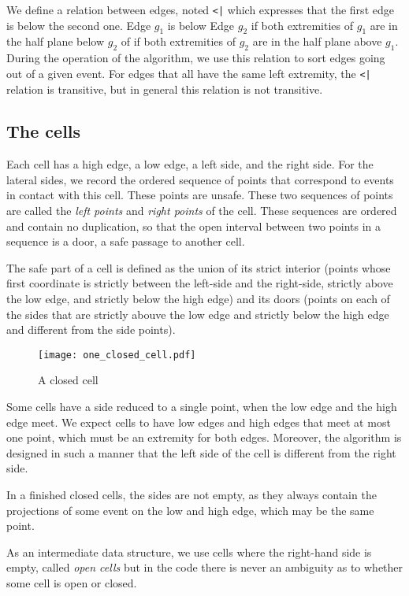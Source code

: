 \documentclass[a4paper, USenglish, cleveref, autoref, thm-restate]{lipics-v2021}
\begin{document}
We define a relation between edges, noted {\tt <|} which expresses
that the first edge is below the second one.  Edge \(g_1\) is below Edge
\(g_2\) if both extremities of \(g_1\) are in the half plane below
\(g_2\) of if both extremities of \(g_2\) are in the half plane above
\(g_1\).  During the operation of the algorithm, we use this relation
to sort edges going out of a given event.  For edges that all have the
same left extremity, the {\tt <|} relation is transitive, but in
general this relation is not transitive.
\subsection{The cells}
Each cell has a high edge, a low edge, a left side, and the right side.  For
the lateral sides, we record the ordered sequence of points that
correspond  to events in contact with this cell.  These points are
unsafe.  These two sequences of points are called the {\em left
  points} and {\em right points} of the cell.  These sequences are
ordered and contain no duplication, so that the open interval between two
points in a sequence is a door, a safe passage to another cell.

The safe part of a cell is defined as the union of its strict interior
(points whose first coordinate is strictly between the left-side and
the right-side, strictly above the low edge, and strictly below the
high edge) and its doors (points on each of the sides that are
strictly abouve the low edge and strictly below the high edge and
different from the side points).

\begin{figure}
\texttt{[image: one\_closed\_cell.pdf]}
\caption{A closed cell}
\end{figure}

Some cells have a side reduced to a single point, when the low edge
and the high edge meet.  We expect cells to have low edges and high
edges that meet at most one point, which must be an extremity for both
edges.  Moreover, the algorithm is designed in such a manner that the
left side of the cell is different from the right side.

In a finished closed cells, the sides are not empty, as they always
contain the projections of some event on the low and high edge, which
may be the same point.

As an intermediate data structure, we use cells where the
right-hand side is empty, called {\em open cells}  but in the code
there is never an ambiguity as to whether some cell is open or closed.
\end{document}
